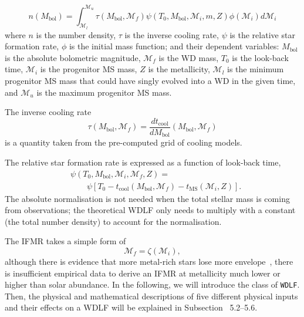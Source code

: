 \documentclass[fleqn,usenatbib]{rasti}
\begin{document}
\begin{equation}
    n(M_{\mathrm{bol}}) = \int_{\mathcal{M}_l}^{\mathcal{M}_u}
        \tau(M_\mathrm{bol}, \mathcal{M}_f)
        \psi(T_0, M_\mathrm{bol}, \mathcal{M}_i, m, Z)
        \phi(\mathcal{M}_i) d\mathcal{M}_i
\end{equation}
where $n$ is the number density, $\tau$ is the inverse cooling rate, $\psi$ is
the relative star formation rate, $\phi$ is the initial mass function; and their
dependent variables: $M_\mathrm{bol}$ is the absolute bolometric
magnitude, $\mathcal{M}_f$ is the WD mass, $T_0$ is the look-back time, $\mathcal{M}_i$ is
the progenitor MS mass, $Z$ is the metallicity, $\mathcal{M}_l$ is the minimum
progenitor MS mass that could have singly evolved into a WD in the given time,
and $\mathcal{M}_u$ is the maximum progenitor MS mass.

The inverse cooling rate
\begin{equation}
    \tau(M_\mathrm{bol}, \mathcal{M}_f) = \dfrac{dt_{\mathrm{cool}}}{dM_\mathrm{bol}} \left( M_\mathrm{bol}, \mathcal{M}_f \right)
\end{equation}
is a quantity taken from the pre-computed grid of cooling models. 

The relative star formation rate is expressed as a function of look-back time,
\begin{align}
    &\psi(T_0, M_\mathrm{bol}, \mathcal{M}_i, \mathcal{M}_f, Z) =\\
    &\qquad\psi\left[T_0 - t_{\mathrm{cool}}\left(M_\mathrm{bol}, \mathcal{M}_f\right) - t_{\mathrm{MS}}\left(\mathcal{M}_i, Z\right)\right].
\end{align}
The absolute normalisation is not needed when the total stellar mass is coming
from observations; the theoretical WDLF only needs to multiply with a
constant (the total number density) to account for the normalisation.

The IFMR takes a simple form of
\begin{equation}
    \mathcal{M}_f = \zeta(\mathcal{M}_i),
\end{equation}
although there is evidence that more metal-rich stars lose more
envelope~\citep{2007ApJ...671..761K}, there is insufficient empirical data to
derive an IFMR at metallicity much lower or higher than solar abundance.
In the following, we will introduce the class of \texttt{WDLF}. Then, the
physical and mathematical descriptions of five different physical inputs and
their effects on a WDLF will be explained in Subsection \textsection~5.2--5.6.
\end{document}
